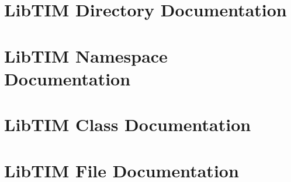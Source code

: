 \documentclass[a4paper]{book}
\begin{document}
\chapter{Lib\-TIM Directory Documentation}


\chapter{Lib\-TIM Namespace Documentation}


\chapter{Lib\-TIM Class Documentation}















\chapter{Lib\-TIM File Documentation}









































\printindex
\end{document}
